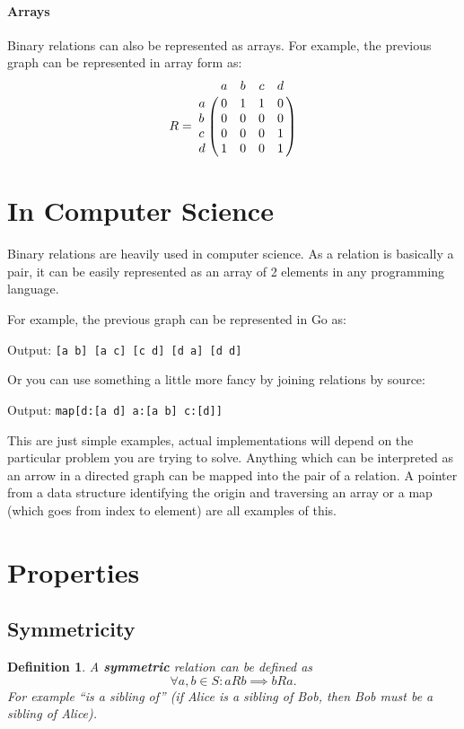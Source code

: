\documentclass[11pt]{article}
\theoremstyle{plain}
\newtheorem{defn}{Definition}
\theoremstyle{definition}
\begin{document}
\paragraph{Arrays} Binary relations can also be represented as arrays.
For example,
the previous graph can be represented in array form as:
\begin{equation*}
  R = \bordermatrix{~ & a & b & c & d \cr
  a & 0 & 1 & 1 & 0 \cr
  b & 0 & 0 & 0 & 0 \cr
  c & 0 & 0 & 0 & 1 \cr
d & 1 & 0 & 0 & 1 \cr}
\end{equation*}

\section{In Computer Science}

Binary relations are heavily used in computer science.
As a relation is basically a pair,
it can be easily represented as an array of 2 elements in any programming language.

For example, the previous graph can be represented in Go as:



Output: \verb+[a b] [a c] [c d] [d a] [d d]+

Or you can use something a little more fancy by joining relations by source:



Output: \verb+map[d:[a d] a:[a b] c:[d]]+

This are just simple examples,
actual implementations will depend on the particular problem you are trying to solve.
Anything which can be interpreted as an arrow in a directed graph can be mapped into the pair of a relation.
A pointer from a data structure identifying the origin and  traversing an array or a map (which goes from index to element) are all examples of this.

\section{Properties}

\subsection{Symmetricity}

\begin{defn}
  A \textbf{symmetric} relation can be defined as
  \[ \forall a, b \in S: aRb \implies bRa .\]
  For example ``is a sibling of'' (if Alice is a sibling of Bob, then Bob must be a sibling of Alice).
\end{defn}
\end{document}

